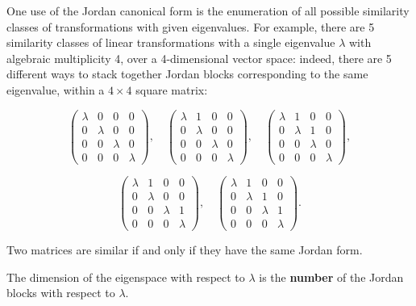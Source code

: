 \documentclass[openany]{book}
\begin{document}
\begin{example}
    One use of the Jordan canonical form is the enumeration of all possible similarity classes of transformations with given eigenvalues. For example, there are 5 similarity classes of linear transformations with a single eigenvalue $\lambda$ with algebraic multiplicity 4, over a 4-dimensional vector space: indeed, there are 5 different ways to stack together Jordan blocks corresponding to the same eigenvalue, within a $4 \times 4$ square matrix:

\[
\begin{pmatrix}
\lambda & 0 & 0 & 0 \\
0 & \lambda & 0 & 0 \\
0 & 0 & \lambda & 0 \\
0 & 0 & 0 & \lambda
\end{pmatrix},
\quad
\begin{pmatrix}
\lambda & 1 & 0 & 0 \\
0 & \lambda & 0 & 0 \\
0 & 0 & \lambda & 0 \\
0 & 0 & 0 & \lambda
\end{pmatrix},
\quad
\begin{pmatrix}
\lambda & 1 & 0 & 0 \\
0 & \lambda & 1 & 0 \\
0 & 0 & \lambda & 0 \\
0 & 0 & 0 & \lambda
\end{pmatrix},
\]

\[
\begin{pmatrix}
\lambda & 1 & 0 & 0 \\
0 & \lambda & 0 & 0 \\
0 & 0 & \lambda & 1 \\
0 & 0 & 0 & \lambda
\end{pmatrix},
\quad
\begin{pmatrix}
\lambda & 1 & 0 & 0 \\
0 & \lambda & 1 & 0 \\
0 & 0 & \lambda & 1 \\
0 & 0 & 0 & \lambda
\end{pmatrix}.
\]
\end{example}

\begin{prop}
    Two matrices are similar if and only if they have the same Jordan form.
\end{prop}

\begin{prop}
    The dimension of the eigenspace with respect to $\lambda$ is the \textbf{number} of the Jordan blocks with respect to $\lambda$.
\end{prop}
\end{document}
